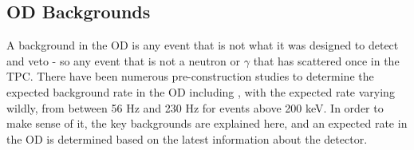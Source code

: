 \subsection{OD Backgrounds}
\label{sec:simulated_od_backgrounds}
\par
A background in the OD is any event that is not what it was designed to detect and veto - so any event that is not a neutron or $\gamma$ that has scattered once in the TPC.
There have been numerous pre-construction studies to determine the expected background rate in the OD including \cite{LZ_TechnicalDesignReview_ref,LZ_projected_sensitivity_paper_ref,sallyshaw_thesis_ref,scotthaselschwardt_thesis_ref,lz_od_taup_2019_ref}, with the expected rate varying wildly, from between 56 Hz and 230 Hz for events above 200 keV.
In order to make sense of it, the key backgrounds are explained here, and an expected rate in the OD is determined based on the latest information about the detector.

